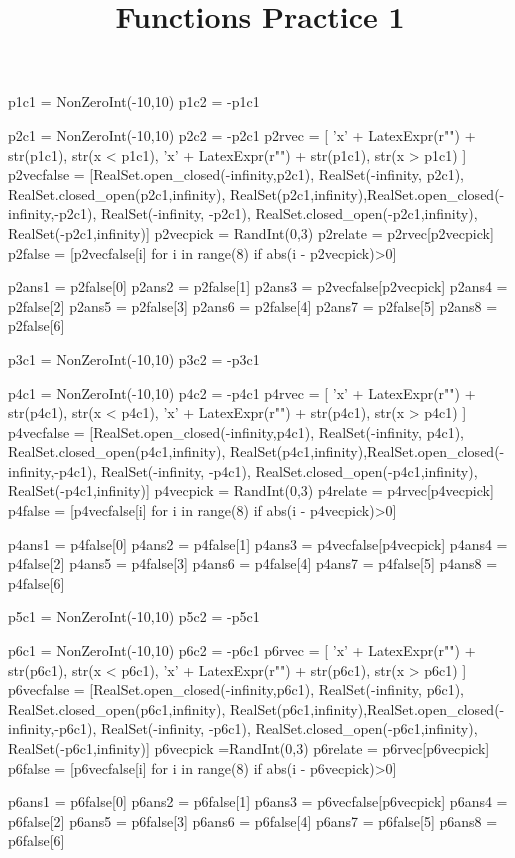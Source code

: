 \documentclass{ximera}
\title{Functions Practice 1}
\begin{document}


\begin{sagesilent}
p1c1 = NonZeroInt(-10,10)
p1c2 = -p1c1

p2c1 = NonZeroInt(-10,10)
p2c2 = -p2c1
p2rvec = [ 'x' + LatexExpr(r"\leq") + str(p1c1), str(x < p1c1), 'x' + LatexExpr(r"\geq") + str(p1c1), str(x > p1c1) ]
p2vecfalse = [RealSet.open_closed(-infinity,p2c1), RealSet(-infinity, p2c1), RealSet.closed_open(p2c1,infinity), RealSet(p2c1,infinity),RealSet.open_closed(-infinity,-p2c1), RealSet(-infinity, -p2c1), RealSet.closed_open(-p2c1,infinity), RealSet(-p2c1,infinity)]
p2vecpick = RandInt(0,3)
p2relate = p2rvec[p2vecpick]
p2false = [p2vecfalse[i] for i in range(8) if abs(i - p2vecpick)>0]

p2ans1 = p2false[0]
p2ans2 = p2false[1]
p2ans3 = p2vecfalse[p2vecpick]
p2ans4 = p2false[2]
p2ans5 = p2false[3]
p2ans6 = p2false[4]
p2ans7 = p2false[5]
p2ans8 = p2false[6]

p3c1 = NonZeroInt(-10,10)
p3c2 = -p3c1

p4c1 = NonZeroInt(-10,10)
p4c2 = -p4c1
p4rvec = [ 'x' + LatexExpr(r"\leq") + str(p4c1), str(x < p4c1), 'x' + LatexExpr(r"\geq") + str(p4c1), str(x > p4c1) ]
p4vecfalse = [RealSet.open_closed(-infinity,p4c1), RealSet(-infinity, p4c1), RealSet.closed_open(p4c1,infinity), RealSet(p4c1,infinity),RealSet.open_closed(-infinity,-p4c1), RealSet(-infinity, -p4c1), RealSet.closed_open(-p4c1,infinity), RealSet(-p4c1,infinity)]
p4vecpick = RandInt(0,3)
p4relate = p4rvec[p4vecpick]
p4false = [p4vecfalse[i] for i in range(8) if abs(i - p4vecpick)>0]

p4ans1 = p4false[0]
p4ans2 = p4false[1]
p4ans3 = p4vecfalse[p4vecpick]
p4ans4 = p4false[2]
p4ans5 = p4false[3]
p4ans6 = p4false[4]
p4ans7 = p4false[5]
p4ans8 = p4false[6]

p5c1 = NonZeroInt(-10,10)
p5c2 = -p5c1

p6c1 = NonZeroInt(-10,10)
p6c2 = -p6c1
p6rvec = [ 'x' + LatexExpr(r"\leq") + str(p6c1), str(x < p6c1), 'x' + LatexExpr(r"\geq") + str(p6c1), str(x > p6c1) ]
p6vecfalse = [RealSet.open_closed(-infinity,p6c1), RealSet(-infinity, p6c1), RealSet.closed_open(p6c1,infinity), RealSet(p6c1,infinity),RealSet.open_closed(-infinity,-p6c1), RealSet(-infinity, -p6c1), RealSet.closed_open(-p6c1,infinity), RealSet(-p6c1,infinity)]
p6vecpick =RandInt(0,3)
p6relate = p6rvec[p6vecpick]
p6false = [p6vecfalse[i] for i in range(8) if abs(i - p6vecpick)>0]

p6ans1 = p6false[0]
p6ans2 = p6false[1]
p6ans3 = p6vecfalse[p6vecpick]
p6ans4 = p6false[2]
p6ans5 = p6false[3]
p6ans6 = p6false[4]
p6ans7 = p6false[5]
p6ans8 = p6false[6]



\end{sagesilent}
\end{document}
